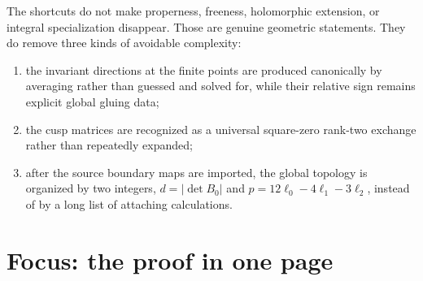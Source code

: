 \documentclass[11pt,reqno]{amsart}
\numberwithin{equation}{section}
\theoremstyle{definition}
\begin{document}
The shortcuts do not make properness, freeness, holomorphic extension, or integral specialization disappear. Those are genuine geometric statements. They do remove three kinds of avoidable complexity:
\begin{enumerate}
\item the invariant directions at the finite points are produced canonically by averaging rather than guessed and solved for, while their relative sign remains explicit global gluing data;
\item the cusp matrices are recognized as a universal square-zero rank-two exchange rather than repeatedly expanded;
\item after the source boundary maps are imported, the global topology is organized by two integers, $d=|\det B_0|$ and $p=12\ell_0-4\ell_1-3\ell_2$, instead of by a long list of attaching calculations.
\end{enumerate}

\section{Focus: the proof in one page}\label{sec:focus}
\end{document}
